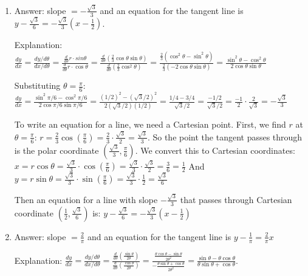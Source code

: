 \begin{Answer}[ref = polar3]
\begin{enumerate}
\item Answer: slope $ = -\frac{\sqrt{3}}{3}$ and an equation for the tangent 
line is $y - \frac{\sqrt{3}}{6} = -\frac{\sqrt{3}}{3} \left( x - \frac{1}{2} 
\right)$. 

Explanation: $\frac{dy}{dx} = \frac{dy/d\theta}{dx/d\theta} = \frac{\frac{d}{d
\theta}r \cdot sin{\theta}}{\frac{d}{d\theta} r \cdot \cos{\theta}} = \frac{
\frac{d}{d\theta} \left( \frac{2}{3} \cos{\theta} \sin{\theta} \right)}{\frac{
d}{d\theta} \left( \frac{2}{3} \cos^2{\theta} \right)} = \frac{\frac{2}{3} 
\left( \cos^2{\theta} -\sin^2{\theta} \right)}{\frac{2}{3} \left( -2\cos{
\theta}\sin{\theta}\right)} = \frac{\sin^2{\theta} - \cos^2{\theta}}{2\cos{
\theta}\sin{\theta}}$

Substituting $\theta = \frac{\pi}{6}$: $\frac{dy}{dx} = \frac{\sin^2{\pi/6} - 
\cos^2{\pi/6}}{2\cos{\pi/6}\sin{\pi/6}} = \frac{\left(1/2 \right)^2 - \left(
\sqrt{3}/2\right)^2}{2\left(\sqrt{3}/2\right) \left(1/2\right)} = \frac{1/4 - 
3/4}{\sqrt{3}/2} = \frac{-1/2}{\sqrt{3}/2} = \frac{-1}{2} \cdot \frac{2}{\sqrt{
3}} = -\frac{\sqrt{3}}{3}$

To write an equation for a line, we need a Cartesian point. First, we find $r$ 
at $\theta = \frac{\pi}{6}$: $r = \frac{2}{3}\cos{\left( \frac{\pi}{6} \right)}
= \frac{2}{3} \cdot \frac{\sqrt{3}}{2} = \frac{\sqrt{3}}{3}$. So the point the 
tangent passes through is the polar coordinate $\left( \frac{\sqrt{3}}{3}, 
\frac{\pi}{6} \right)$. We convert this to Cartesian coordinates: $x = r \cos{
\theta} = \frac{\sqrt{3}}{3} \cdot \cos{\left( \frac{\pi}{6} \right)} = \frac{
\sqrt{3}}{3} \cdot \frac{\sqrt{3}}{2} = \frac{3}{6} = \frac{1}{2}$ And $y = r
\sin{\theta} = \frac{\sqrt{3}}{3} \cdot \sin{\left( \frac{\pi}{6} \right)} = 
\frac{\sqrt{3}}{3} \cdot \frac{1}{2} = \frac{\sqrt{3}}{6}$

Then an equation for a line with slope $-\frac{\sqrt{3}}{3}$ that passes 
through Cartesian coordinate $\left( \frac{1}{2}, \frac{\sqrt{3}}{6} \right)$ 
is: $y - \frac{\sqrt{3}}{6} = -\frac{\sqrt{3}}{3} \left( x - \frac{1}{2} 
\right)$

\item Answer: slope $= \frac{2}{\pi}$ and an equation for the tangent line is 
$y - \frac{1}{\pi} = \frac{2}{\pi}x$

Explanation: $\frac{dy}{dx} = \frac{dy/d\theta}{dx/d\theta} = \frac{\frac{d}{d
\theta} \left( \frac{\sin{\theta}}{2\theta}\right)}{\frac{d}{d\theta} \left( 
\frac{\cos{\theta}}{2\theta}\right)} = \frac{\frac{\theta \cos{\theta} - \sin{
\theta}}{2\theta^2}}{-\frac{\theta\sin{\theta} + \cos{\theta}}{2\theta^2}} = 
\frac{\sin{\theta} - \theta\cos{\theta}}{\theta\sin{\theta} + \cos{\theta}}$. 


\end{enumerate}
\end{Answer}
